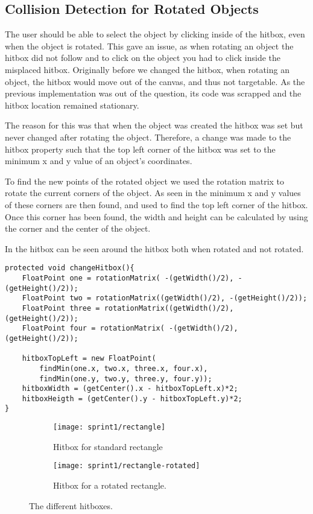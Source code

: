 \subsection{Collision Detection for Rotated Objects}
The user should be able to select the object by clicking inside of the hitbox, even when the object is rotated.
This gave an issue, as when rotating an object the hitbox did not follow and to click on the object you had to click inside the misplaced hitbox. 
Originally before we changed the hitbox, when rotating an object, the hitbox would move out of the canvas, and thus not targetable. As the previous implementation was out of the question, its code was scrapped and the hitbox location remained stationary.

The reason for this was that when the object was created the hitbox was set but never changed after rotating the object.
Therefore, a change was made to the hitbox property such that the top left corner of the hitbox was set to the minimum x and y value of an object's coordinates.

To find the new points of the rotated object we used the rotation matrix to rotate the current corners of the object.
As seen in  the minimum x and y values of these corners are then found, and used to find the top left corner of the hitbox.
Once this corner has been found, the width and height can be calculated by using the corner and the center of the object.

In  the hitbox can be seen around the hitbox both when rotated and not rotated.

\begin{lstlisting}[caption={Method to change the hitbox},label=lst:changeHitbox]
protected void changeHitbox(){
	FloatPoint one = rotationMatrix( -(getWidth()/2), -(getHeight()/2));
	FloatPoint two = rotationMatrix((getWidth()/2), -(getHeight()/2));
	FloatPoint three = rotationMatrix((getWidth()/2), (getHeight()/2));
	FloatPoint four = rotationMatrix( -(getWidth()/2), (getHeight()/2));
	
	hitboxTopLeft = new FloatPoint(
	    findMin(one.x, two.x, three.x, four.x),
	    findMin(one.y, two.y, three.y, four.y));
	hitboxWidth = (getCenter().x - hitboxTopLeft.x)*2;
	hitboxHeigth = (getCenter().y - hitboxTopLeft.y)*2;
}
\end{lstlisting}



\begin{figure}[h]
	\centering
	\begin{subfigure}[b]{0.45\textwidth}
		\centering
		\texttt{[image: sprint1/rectangle]}
		\caption{Hitbox for standard rectangle}
		\label{figure:hitbox-rectangle}
	\end{subfigure}
	\qquad
	\begin{subfigure}[b]{0.45\textwidth}
		\centering
		\texttt{[image: sprint1/rectangle-rotated]}
		\caption{Hitbox for a rotated rectangle.}
		\label{figure:hitbox-rotated-rectangle}
	\end{subfigure}
	\caption{The different hitboxes.}
	\label{figure:hitbox}
\end{figure}

